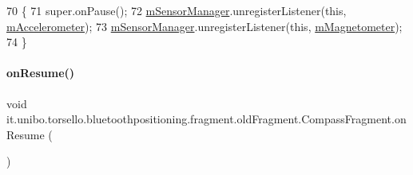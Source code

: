 \begin{DoxyCode}
70                           \{
71         super.onPause();
72         \hyperlink{classit_1_1unibo_1_1torsello_1_1bluetoothpositioning_1_1fragment_1_1oldFragment_1_1CompassFragment_a9006c75f41300481eaa95c6bb02143e3_a9006c75f41300481eaa95c6bb02143e3}{mSensorManager}.unregisterListener(\textcolor{keyword}{this}, \hyperlink{classit_1_1unibo_1_1torsello_1_1bluetoothpositioning_1_1fragment_1_1oldFragment_1_1CompassFragment_a9f521d80f0f7b0e89bb26951c2e463c0_a9f521d80f0f7b0e89bb26951c2e463c0}{mAccelerometer});
73         \hyperlink{classit_1_1unibo_1_1torsello_1_1bluetoothpositioning_1_1fragment_1_1oldFragment_1_1CompassFragment_a9006c75f41300481eaa95c6bb02143e3_a9006c75f41300481eaa95c6bb02143e3}{mSensorManager}.unregisterListener(\textcolor{keyword}{this}, \hyperlink{classit_1_1unibo_1_1torsello_1_1bluetoothpositioning_1_1fragment_1_1oldFragment_1_1CompassFragment_a9e3cd0081d45a26094a8395fe67736c6_a9e3cd0081d45a26094a8395fe67736c6}{mMagnetometer});
74     \}
\end{DoxyCode}
\hypertarget{classit_1_1unibo_1_1torsello_1_1bluetoothpositioning_1_1fragment_1_1oldFragment_1_1CompassFragment_a32aa07ca1beb0091037267d8d56b9bb2_a32aa07ca1beb0091037267d8d56b9bb2}{}\label{classit_1_1unibo_1_1torsello_1_1bluetoothpositioning_1_1fragment_1_1oldFragment_1_1CompassFragment_a32aa07ca1beb0091037267d8d56b9bb2_a32aa07ca1beb0091037267d8d56b9bb2} 
\paragraph{\texorpdfstring{on\+Resume()}{onResume()}}
{\footnotesize\ttfamily void it.\+unibo.\+torsello.\+bluetoothpositioning.\+fragment.\+old\+Fragment.\+Compass\+Fragment.\+on\+Resume (\begin{DoxyParamCaption}{ }\end{DoxyParamCaption})}


